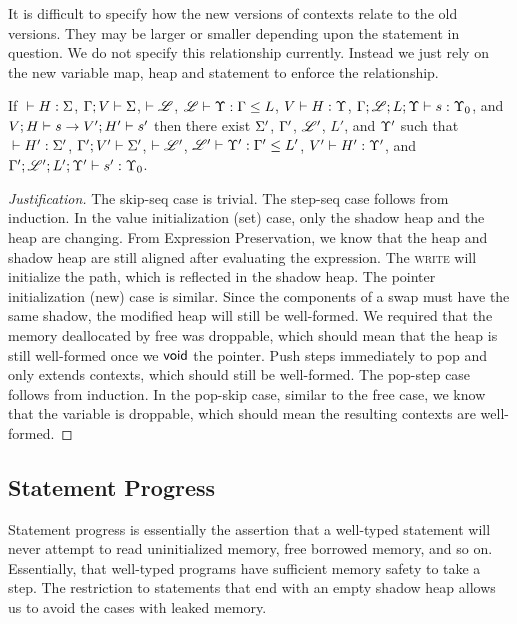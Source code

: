 It is difficult to specify how the new versions of contexts relate to the old versions.
They may be larger or smaller depending upon the statement in question.
We do not specify this relationship currently.
Instead we just rely on the new variable map, heap and statement to enforce
the relationship.

\begin{conj}
  If ${} \vdash {H} : {\Sigma}$, $\Gamma;V\vdash\Sigma$, $\vdash\mathscr{L}$, ${\mathscr{L}} \vdash {\Upsilon} : {\Gamma} \leq {L}$,
  ${V} \vdash {H} : {\Upsilon}$, ${\Gamma;\mathscr{L};L;\Upsilon} \vdash {s} : {\Upsilon_0}$, and ${V};{H}\vdash{s}\to{V'};{H'}\vdash{s'}$
  then there exist $\Sigma'$, $\Gamma'$, $\mathscr{L}'$, $L'$, and $\Upsilon'$ such that
  ${} \vdash {H'} : {\Sigma'}$, $\Gamma';V'\vdash\Sigma'$, $\vdash\mathscr{L}'$, ${\mathscr{L}'} \vdash {\Upsilon'} : {\Gamma'} \leq {L'}$,
  ${V'} \vdash {H'} : {\Upsilon'}$, and ${\Gamma';\mathscr{L}';L';\Upsilon'} \vdash {s'} : {\Upsilon_0}$.

\end{conj}

\begin{proof}[Justification]
  The skip-seq case is trivial.
  The step-seq case follows from induction.
  In the value initialization (set) case, only the shadow heap and the heap are changing.
  From Expression Preservation, we know that the heap and shadow heap are still aligned
  after evaluating the expression. The \textsc{write} will initialize the path, which
  is reflected in the shadow heap.
  The pointer initialization (new) case is similar.
  Since the components of a swap must have the same shadow, the modified heap will
  still be well-formed.
  We required that the memory deallocated by \textsf{free} was droppable, which
  should mean that the heap is still well-formed once we $\mathsf{void}$ the pointer.
  Push steps immediately to pop and only extends contexts, which should still be well-formed.
  The pop-step case follows from induction.
  In the pop-skip case, similar to the \textsf{free} case, we know that the variable
  is droppable, which should mean the resulting contexts are well-formed.
\end{proof}

\subsection*{Statement Progress}
Statement progress is essentially the assertion that a well-typed statement will
never attempt to read uninitialized memory, free borrowed memory, and so on.
Essentially, that well-typed programs have sufficient memory safety to take a step.
The restriction to statements that end with an empty shadow heap allows us
to avoid the cases with leaked memory.

